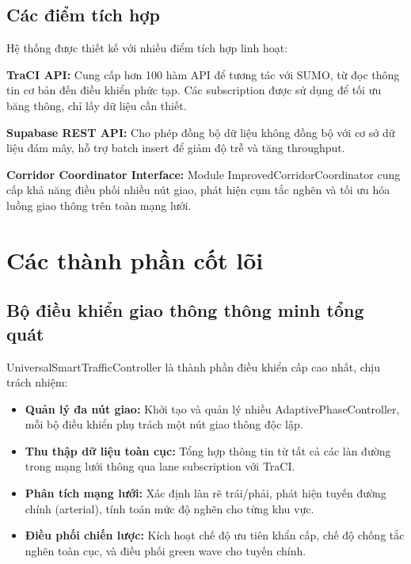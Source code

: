 \subsection{Các điểm tích hợp}

Hệ thống được thiết kế với nhiều điểm tích hợp linh hoạt:

\textbf{TraCI API:} Cung cấp hơn 100 hàm API để tương tác với SUMO, từ đọc thông tin cơ bản đến điều khiển phức tạp. Các subscription được sử dụng để tối ưu băng thông, chỉ lấy dữ liệu cần thiết.

\textbf{Supabase REST API:} Cho phép đồng bộ dữ liệu không đồng bộ với cơ sở dữ liệu đám mây, hỗ trợ batch insert để giảm độ trễ và tăng throughput.

\textbf{Corridor Coordinator Interface:} Module ImprovedCorridorCoordinator cung cấp khả năng điều phối nhiều nút giao, phát hiện cụm tắc nghẽn và tối ưu hóa luồng giao thông trên toàn mạng lưới.

\section{Các thành phần cốt lõi}

\subsection{Bộ điều khiển giao thông thông minh tổng quát}

UniversalSmartTrafficController là thành phần điều khiển cấp cao nhất, chịu trách nhiệm:

\begin{itemize}
    \item \textbf{Quản lý đa nút giao:} Khởi tạo và quản lý nhiều AdaptivePhaseController, mỗi bộ điều khiển phụ trách một nút giao thông độc lập.
    
    \item \textbf{Thu thập dữ liệu toàn cục:} Tổng hợp thông tin từ tất cả các làn đường trong mạng lưới thông qua lane subscription với TraCI.
    
    \item \textbf{Phân tích mạng lưới:} Xác định làn rẽ trái/phải, phát hiện tuyến đường chính (arterial), tính toán mức độ nghẽn cho từng khu vực.
    
    \item \textbf{Điều phối chiến lược:} Kích hoạt chế độ ưu tiên khẩn cấp, chế độ chống tắc nghẽn toàn cục, và điều phối green wave cho tuyến chính.
\end{itemize}

